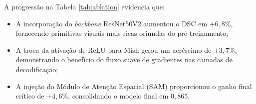 A progress\~{a}o na Tabela \ref{tab:ablation} evidencia que:
\begin{itemize}
    \item A incorpora\c{c}\~{a}o do \textit{backbone} ResNet50V2 aumentou o DSC em $+6,8\%$, fornecendo primitivas visuais mais ricas oriundas do pr\'{e}-treinamento;
    \item A troca da ativa\c{c}\~{a}o de ReLU para Mish gerou um acr\'{e}scimo de $+3,7\%$, demonstrando o benef\'{i}cio do fluxo suave de gradientes nas camadas de decodifica\c{c}\~{a}o;
    \item A inje\c{c}\~{a}o do M\'{o}dulo de Aten\c{c}\~{a}o Espacial (SAM) proporcionou o ganho final cr\'{i}tico de $+4,6\%$, consolidando o modelo final em $0,865$.
\end{itemize}
